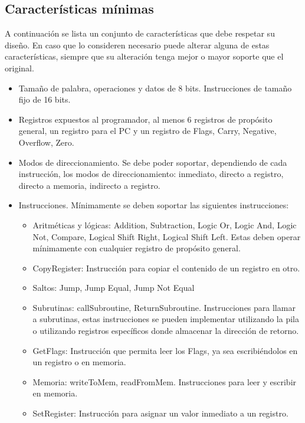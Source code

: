 \documentclass[a4paper,11pt]{article}
\begin{document}
\subsection{Características mínimas}

A continuación se lista un conjunto de características que debe respetar su diseño.
En caso que lo consideren necesario puede alterar alguna de estas características, siempre que su alteración tenga mejor o mayor soporte que el original.

\begin{itemize}

\item Tamaño de palabra, operaciones y datos de 8 bits. Instrucciones de tamaño fijo de 16 bits.
\item Registros expuestos al programador, al menos 6 registros de propósito general, un registro para el PC y un registro de Flags, Carry, Negative, Overflow, Zero.

\item Modos de direccionamiento. Se debe poder soportar, dependiendo de cada instrucción, los modos de direccionamiento: inmediato, directo a registro, directo a memoria, indirecto a registro.

\item Instrucciones. Mínimamente se deben soportar las siguientes instrucciones:
\begin{itemize}
    \item Aritméticas y lógicas: Addition, Subtraction, Logic Or, Logic And, Logic Not, Compare, Logical Shift Right, Logical Shift Left. Estas deben operar mínimamente con cualquier registro de propósito general.
    \item CopyRegister: Instrucción para copiar el contenido de un registro en otro.
    \item Saltos: Jump, Jump Equal, Jump Not Equal
    \item Subrutinas: callSubroutine, ReturnSubroutine. Instrucciones para llamar a subrutinas, estas instrucciones se pueden implementar utilizando la pila o utilizando registros específicos donde almacenar la dirección de retorno.
    \item GetFlags: Instrucción que permita leer los Flags, ya sea escribiéndolos en un registro o en memoria.
    \item Memoria: writeToMem, readFromMem. Instrucciones para leer y escribir en memoria.
    \item SetRegister: Instrucción para asignar un valor inmediato a un registro.
\end{itemize}


\end{itemize}
\end{document}
